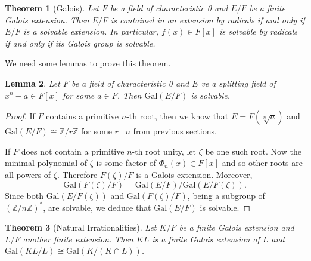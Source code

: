 \documentclass[12pt]{report}
\newtheorem{theorem}{Theorem}[section]
\newtheorem{lemma}[theorem]{Lemma}
\theoremstyle{definition}
\newcommand{\gal}{\text{Gal}}
\newcommand{\zz}{\mathbb{Z}}
\begin{document}
\begin{theorem}[Galois]\label{galoissol}
	Let $F$ be a field of characteristic 0 and $E/F$ be a finite Galois extension. Then $E/F$ is contained in an extension by radicals if and only if $E/F$ is a solvable extension. In particular, $f(x)\in F[x]$ is solvable by radicals if and only if its Galois group is solvable.
\end{theorem}

We need some lemmas to prove this theorem.

\begin{lemma}
	Let $F$ be a field of characteristic 0 and $E$ ve a splitting field of $x^n-a\in F[x]$ for some $a\in F$. Then $\gal(E/F)$ is solvable.
\end{lemma}

\begin{proof}
	If $F$ contains a primitive $n$-th root, then we know that $E=F(\sqrt[n]{a})$ and $\gal(E/F)\cong \zz/r\zz$ for some $r\mid n$ from previous sections.


	If $F$ does not contain a primitive $n$-th root unity, let $\zeta$ be one such root. Now the minimal polynomial of $\zeta$ is some factor of $\Phi_n(x)\in F[x]$ and so other roots are all powers of $\zeta$. Therefore $F(\zeta)/F$ is a Galois extension. Moreover, \[\gal(F(\zeta)/F)=\gal(E/F)/\gal(E/F(\zeta)).\]
	Since both $\gal(E/F(\zeta))$ and $\gal(F(\zeta)/F)$, being a subgroup of $(\zz/n\zz)^*$, are solvable, we deduce that $\gal(E/F)$ is solvable.
\end{proof}

\begin{theorem}[Natural Irrationalities]
	Let $K/F$ be a finite Galois extension and $L/F$ another finite extension. Then $KL$ is a finite Galois extension of $L$ and $\gal(KL/L)\cong \gal(K/(K\cap L))$.
\end{theorem}
\end{document}
